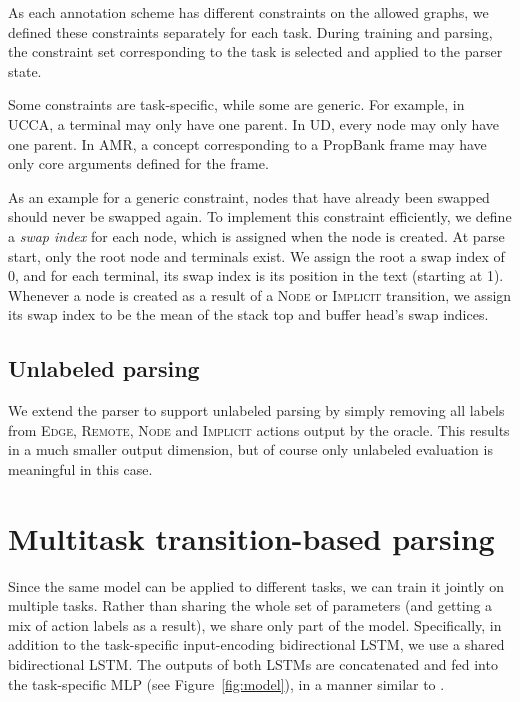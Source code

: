\documentclass[11pt,a4paper]{article}
\begin{document}
As each annotation scheme has different constraints on the allowed graphs,
we defined these constraints separately for each task.
During training and parsing, the constraint set corresponding to the task is
selected and applied to the parser state.

Some constraints are task-specific, while some are generic.
For example, in UCCA, a terminal may only have one parent.
In UD, every node may only have one parent.
In AMR, a concept corresponding to a PropBank frame may have only core arguments defined for the frame.

As an example for a generic constraint, nodes that have already been swapped
should never be swapped again.
To implement this constraint efficiently, we define a \textit{swap index}
for each node, which is assigned when the node is created.
At parse start, only the root node and terminals exist.
We assign the root a swap index of 0, and for each terminal, its swap index
is its position in the text (starting at 1).
Whenever a node is created as a result of a \textsc{Node} or \textsc{Implicit}
transition, we assign its swap index to be the mean of the stack top and buffer
head's swap indices.


\subsection{Unlabeled parsing}\label{sec:unlabeled}

We extend the parser to support unlabeled parsing by simply removing all labels from
\textsc{Edge}, \textsc{Remote}, \textsc{Node} and \textsc{Implicit} actions output by the oracle.
This results in a much smaller output dimension, but of course only unlabeled evaluation is
meaningful in this case.



\section{Multitask transition-based parsing}\label{sec:multitask}

Since the same model can be applied to different tasks, we can train it jointly on multiple tasks.
Rather than sharing the whole set of parameters (and getting a mix of action labels as a result),
we share only part of the model.
Specifically, in addition to the task-specific input-encoding bidirectional LSTM,
we use a shared bidirectional LSTM. The outputs of both LSTMs are concatenated and
fed into the task-specific MLP (see Figure~\ref{fig:model}),
in a manner similar to \citet{P17-1186}.
\end{document}

